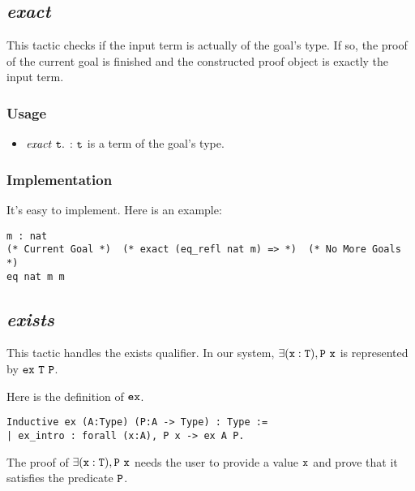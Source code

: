 \subsection{\it exact}

This tactic checks if the input term is actually of the goal's type. If so, the proof of the current goal is finished and the 
constructed proof object is exactly the input term.

\subsubsection*{Usage}
\begin{itemize}
\item ${\it exact}\ \tt t.$ : $\tt t$ is a term of the goal's type. 
\end{itemize}

\subsubsection*{Implementation}
It's easy to implement. Here is an example:
\begin{center}
\begin{minipage}{0.8\textwidth}
\begin{verbatim}
m : nat                                                      
(* Current Goal *)  (* exact (eq_refl nat m) => *)  (* No More Goals *)
eq nat m m                                       
\end{verbatim}
\end{minipage}
\end{center}

\subsection{\it exists}

This tactic handles the exists qualifier. In our system, $\tt\exists (x:T),P\ x$ is represented by $\tt ex\ T\ P$.

Here is the definition of $\tt ex$.
\begin{center}
\begin{minipage}{0.6\textwidth}
\begin{verbatim}
Inductive ex (A:Type) (P:A -> Type) : Type :=
| ex_intro : forall (x:A), P x -> ex A P.    
\end{verbatim}
\end{minipage}
\end{center}

The proof of $\tt\exists (x:T), P\ x$ needs the user to provide a value $\tt x$
and prove that it satisfies the predicate $\tt P$.

